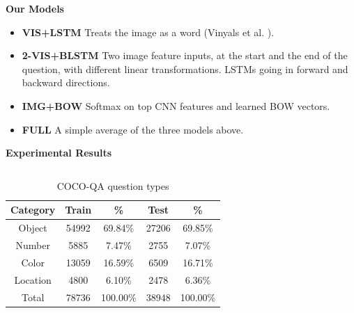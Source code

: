 \documentclass{beamer}
\renewcommand{\*}[1]{\textbf{#1}}
\begin{document}
\begin{frame}{}
\begin{columns}[T]
\begin{column}{0.32\linewidth}
\begin{block}{\bf{\large Our Models}}
\begin{itemize}
\item \*{VIS+LSTM} Treats the image as a word (Vinyals et al. \cite{vinyals14}).

\begin{figure}[t!]
\centering
\small
\scalebox{1.0}{
}
\label{fig:imgword}
\end{figure}
\vskip 0.5in

\item \*{2-VIS+BLSTM} Two image feature inputs, at the start and the end of the
question, with different linear transformations. LSTMs going in forward and
backward directions. 

\item \*{IMG+BOW} Softmax on top CNN features and learned BOW vectors.

\item \*{FULL} A simple average of the three models above.
\end{itemize}
\end{block}
\vfill

\begin{block}{\bf{\large Experimental Results}}

\begin{columns}

\begin{column}{0.6\linewidth}
\begin{table}[t!]
\caption{COCO-QA question types}
\small
\label{tab:dataset_category_stats}
\begin{center}

\begin{tabular}{c c c c c}
\hline
Category & Train & \%       & Test  & \%       \\
\hline
Object   & 54992 & 69.84\%  & 27206 & 69.85\%  \\
Number   & 5885  & 7.47\%   & 2755  & 7.07\%   \\
Color    & 13059 & 16.59\%  & 6509  & 16.71\%  \\
Location & 4800  & 6.10\%   & 2478  & 6.36\%   \\
\hline
Total    & 78736 & 100.00\% & 38948 & 100.00\% \\
\hline
\end{tabular}

\end{center}
\end{table}
\end{column}


\end{columns}
\end{block}
\end{column}
\end{columns}
\end{frame}
\end{document}
